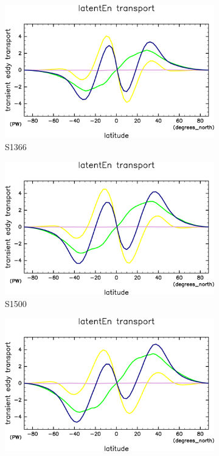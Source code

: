 \documentclass[body]{subfiles}
\begin{document}
\begin{figure}[t]
	\centering
	\begin{subfigure}{.4\textwidth}
		\centering
		\includegraphics[width=\textwidth]{S1366/MeriHeatTrans@latentEn,time=14600:14965-crop-rotate.pdf}
		\caption{S1366}\label{潜熱S1366}
	\end{subfigure}
	\begin{subfigure}{.4\textwidth}
		\centering
		\includegraphics[width=\textwidth]{S1500/MeriHeatTrans@latentEn,time=3650:4015-crop-rotate.pdf}
		\caption{S1500}\label{潜熱S1500}
	\end{subfigure}
	\begin{subfigure}{.4\textwidth}
		\centering
		\includegraphics[width=\textwidth]{S1600/MeriHeatTrans@latentEn,time=3650:4015-crop-rotate.pdf}

\end{subfigure}
\end{figure}
\end{document}
